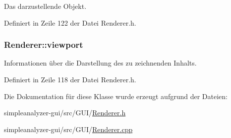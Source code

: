 Das darzustellende Objekt. 



Definiert in Zeile 122 der Datei Renderer.\-h.

\hypertarget{classRenderer_a4428a5ef0ceaf4de5c9991a40990994d}{
\subsubsection[{viewport}]{ Renderer\-::viewport\hspace{0.3cm}{\ttfamily [private]}}}\label{classRenderer_a4428a5ef0ceaf4de5c9991a40990994d}


Informationen über die Darstellung des zu zeichnenden Inhalts. 



Definiert in Zeile 118 der Datei Renderer.\-h.



Die Dokumentation für diese Klasse wurde erzeugt aufgrund der Dateien\-:\begin{DoxyCompactItemize}
\item 
simpleanalyzer-\/gui/src/\-G\-U\-I/\hyperlink{Renderer_8h}{Renderer.\-h}\item 
simpleanalyzer-\/gui/src/\-G\-U\-I/\hyperlink{Renderer_8cpp}{Renderer.\-cpp}\end{DoxyCompactItemize}
